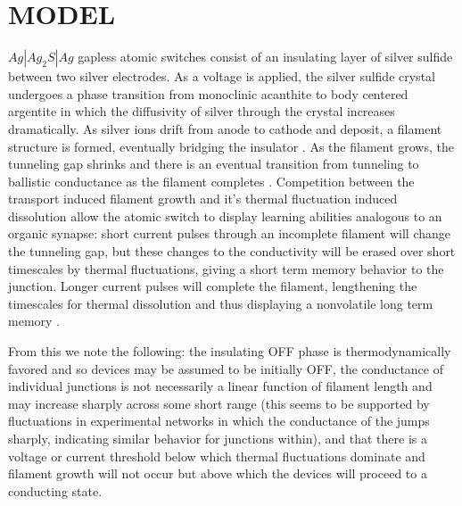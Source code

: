 \documentclass[aps,prl,preprint,groupedaddress]{revtex4-1}
\begin{document}
\section{MODEL}

$Ag | Ag_2 S | Ag$ gapless atomic switches consist of an insulating layer
of silver sulfide between two silver electrodes.  As a voltage is
applied, the silver sulfide crystal undergoes a phase transition from
monoclinic acanthite to body centered argentite in which the diffusivity of
silver through the crystal increases dramatically.  As silver ions drift
from anode to cathode and deposit, a filament structure is formed, eventually
bridging the insulator \cite{Xu2010}. As the filament grows, the
tunneling gap shrinks and there is an eventual transition from tunneling
to ballistic conductance as the filament completes
\cite{Hasegawa2010, Sun2014}. Competition between the transport induced
filament growth and it's thermal fluctuation induced dissolution allow the
atomic switch to display learning abilities analogous to an organic synapse:
short current pulses through an incomplete filament will change the tunneling
gap, but these changes to the conductivity will be erased over short timescales
by thermal fluctuations, giving a short term memory behavior to the junction.
Longer current pulses will complete the filament, lengthening the timescales
for thermal dissolution and thus displaying a nonvolatile long term memory
\cite{Hasegawa2010, Ohno2011}.

From this we note the following: the insulating OFF phase is
thermodynamically favored
and so devices may be assumed to be initially OFF, the conductance of
individual junctions is not necessarily a linear function of filament length
and may increase sharply across some short range (this seems to be supported
by fluctuations in experimental networks in which the conductance of the
jumps sharply, indicating similar behavior for junctions within), and that
there is a voltage or current threshold below which thermal fluctuations
dominate and filament
growth will not occur but above which the devices will proceed to a
conducting state.
\end{document}
